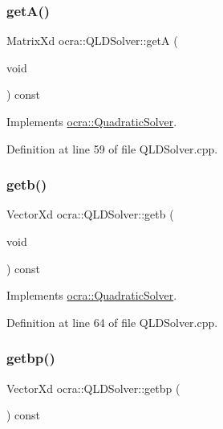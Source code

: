 \subsubsection{\texorpdfstring{get\+A()}{getA()}}
{\footnotesize\ttfamily Matrix\+Xd ocra\+::\+Q\+L\+D\+Solver\+::getA (\begin{DoxyParamCaption}\item[{void}]{ }\end{DoxyParamCaption}) const\hspace{0.3cm}{\ttfamily [virtual]}}



Implements \hyperlink{classocra_1_1QuadraticSolver_aa3904e85d74c7c88c3605a082741b8cd}{ocra\+::\+Quadratic\+Solver}.



Definition at line 59 of file Q\+L\+D\+Solver.\+cpp.

\hypertarget{classocra_1_1QLDSolver_af206f7c0caa5a02c505d613bf3888eea}{}\label{classocra_1_1QLDSolver_af206f7c0caa5a02c505d613bf3888eea} 
\subsubsection{\texorpdfstring{getb()}{getb()}}
{\footnotesize\ttfamily Vector\+Xd ocra\+::\+Q\+L\+D\+Solver\+::getb (\begin{DoxyParamCaption}\item[{void}]{ }\end{DoxyParamCaption}) const\hspace{0.3cm}{\ttfamily [virtual]}}



Implements \hyperlink{classocra_1_1QuadraticSolver_ac051c6a779ce6a6e6e6657cfd3e1f65f}{ocra\+::\+Quadratic\+Solver}.



Definition at line 64 of file Q\+L\+D\+Solver.\+cpp.

\hypertarget{classocra_1_1QLDSolver_abefe0e7142a6d9d5094d8ae6816cce91}{}\label{classocra_1_1QLDSolver_abefe0e7142a6d9d5094d8ae6816cce91} 
\subsubsection{\texorpdfstring{getbp()}{getbp()}}
{\footnotesize\ttfamily Vector\+Xd ocra\+::\+Q\+L\+D\+Solver\+::getbp (\begin{DoxyParamCaption}{ }\end{DoxyParamCaption}) const\hspace{0.3cm}{\ttfamily [virtual]}}




